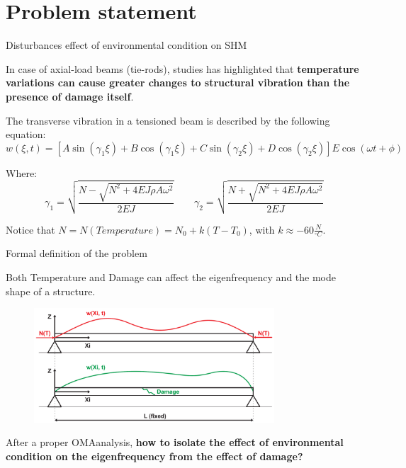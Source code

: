 \section{Problem statement}

\begin{frame}{Disturbances effect of environmental condition on SHM}

    In case of axial-load beams (tie-rods), studies has highlighted that \textbf{temperature variations can cause greater changes to structural vibration than the presence of damage itself}.

    The transverse vibration in a tensioned beam is described by the following equation\footnotemark[1]:
    \begin{equation}
        w(\xi, t) = \left[ A \sin(\gamma_1 \xi) + B \cos(\gamma_1 \xi) + C \sin(\gamma_2 \xi) + D \cos(\gamma_2 \xi)\right] E \cos(\omega t + \phi)
    \end{equation}

    Where:
    \begin{equation}
        \gamma_1 = \sqrt{\frac{N - \sqrt{N^2 + 4EJ \rho A \omega^2}}{2EJ}} \qquad \gamma_2 = \sqrt{\frac{N + \sqrt{N^2 + 4EJ \rho A \omega^2}}{2EJ}}
    \end{equation}

    Notice that $N = N(Temperature) = N_0 + k (T - T_0)$, with $k \approx -60 \frac{N}{^\circ C}$.


\end{frame}



\begin{frame}{Formal definition of the problem}

    Both \textcolor[HTML]{FF0000}{Temperature} and \textcolor[HTML]{00B300}{Damage} can affect the eigenfrequency and the mode shape of a structure.

    \begin{figure}
        \centering
        \includegraphics[width=0.8\textwidth]{img/OCAD/tie-rods.pdf}
    \end{figure}

    After a proper OMA\footnotemark[1] analysis, \textbf{how to isolate the effect of environmental condition on the eigenfrequency from the effect of damage?}


\end{frame}